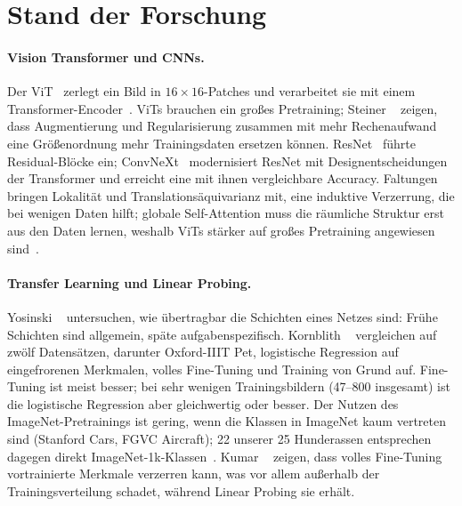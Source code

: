 \section{Stand der Forschung}
\label{sec:related}

\paragraph{Vision Transformer und CNNs.}
Der ViT~\cite{dosovitskiy2021vit} zerlegt ein Bild in $16\times16$-Patches und verarbeitet sie mit einem
Transformer-Encoder~\cite{vaswani2017attention}. ViTs brauchen ein großes Pretraining; Steiner \etal~\cite{steiner2022augreg} zeigen, dass Augmentierung und
Regularisierung zusammen mit mehr Rechenaufwand eine Größenordnung mehr Trainingsdaten ersetzen können.
ResNet~\cite{he2016resnet} führte Residual-Blöcke ein; ConvNeXt~\cite{liu2022convnext} modernisiert
ResNet mit Designentscheidungen der Transformer und erreicht eine mit ihnen vergleichbare Accuracy.
Faltungen bringen Lokalität und Translationsäquivarianz mit, eine induktive Verzerrung, die bei wenigen
Daten hilft; globale Self-Attention muss die räumliche Struktur erst aus den Daten lernen, weshalb ViTs
stärker auf großes Pretraining angewiesen sind~\cite{dosovitskiy2021vit,steiner2022augreg}.

\paragraph{Transfer Learning und Linear Probing.}
Yosinski \etal~\cite{yosinski2014transferable} untersuchen, wie übertragbar die Schichten eines Netzes
sind: Frühe Schichten sind allgemein, späte aufgabenspezifisch. Kornblith \etal~\cite{kornblith2019transfer}
vergleichen auf zwölf Datensätzen, darunter Oxford-IIIT Pet, logistische Regression auf eingefrorenen
Merkmalen, volles Fine-Tuning und Training von Grund auf. Fine-Tuning ist meist besser; bei sehr wenigen
Trainingsbildern (47--800 insgesamt) ist die logistische Regression aber gleichwertig oder besser. Der Nutzen
des ImageNet-Pretrainings ist gering, wenn die Klassen in ImageNet kaum vertreten sind (Stanford Cars,
FGVC Aircraft); 22 unserer 25 Hunderassen entsprechen dagegen direkt ImageNet-1k-Klassen~\cite{russakovsky2015imagenet}. Kumar \etal~\cite{kumar2022finetuning} zeigen, dass volles Fine-Tuning
vortrainierte Merkmale verzerren kann, was vor allem außerhalb der Trainingsverteilung schadet, während
Linear Probing sie erhält.

